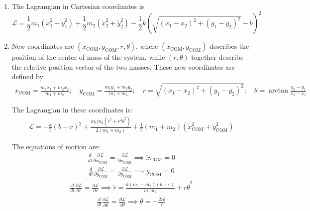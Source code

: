 \documentclass{article}
\theoremstyle{definition}
\newcommand{\p}{\partial}
\newcommand{\lag}{\mathcal{L}}
\newcommand{\f}[2]{\frac{#1}{#2}}
\newcommand{\lp}{\left(}
\newcommand{\rp}{\right)}
\begin{document}
\begin{enumerate}[label = (\alph*)]
	\item The Lagrangian in Cartesian coordinates is 
	\begin{equation*}
	\boxed{
	\lag = \f{1}{2}m_1(\dot{x}_1^2 + \dot{y}_1^2)+ \f{1}{2}m_2(\dot{x}_2^2 + \dot{y}_2^2) - \f{1}{2}k \lp \sqrt{(x_1-x_2)^2+(y_1-y_2)^2} -b \rp^2
	}
	\end{equation*}
	
	
	
	
	\item New coordinates are  $(x_\text{COM},y_{\text{COM}},r,\theta)$, where $(x_\text{COM}, y_\text{COM})$ describes the position of the center of mass of the system, while $(r,\theta)$ together describe the relative position vector of the two masses. These new coordinates are defined by 
	\begin{align*}
	x_\text{COM} = \f{m_1 x_1 + m_2 x_2}{m_1+m_2}; \quad y_\text{COM} = \f{m_1 y_1 + m_2 y_2}{m_1+m_2}; \quad r= \sqrt{(x_1-x_2)^2+(y_1-y_2)^2}; \quad \theta = \arctan\f{y_2-y_1}{x_2-x_1}
	\end{align*}
	
	
	The Lagrangian in these coordinates is:
	\begin{align*}
	\lag = -\f{k}{2} (b-r)^2+\frac{m_1m_2 \left(\dot r^2+r^2 \dot\theta^2\right)}{2(m_1+m_2)}
	+\frac{1}{2}(m_1+m_2) \left(\dot{x}_\text{COM}^2+\dot{y}_\text{COM}^2\right)
	\end{align*}
	
	The equations of motion are:
	\begin{align*}
	\f{d}{dt}\f{\p \lag}{\p \dot{x_\text{COM}}} = \f{\p \lag}{\p x_\text{COM}}
	\implies \ddot{x}_\text{COM} = 0
	\end{align*}
	\begin{align*}
	\f{d}{dt}\f{\p \lag}{\p \dot{y_\text{COM}}} = \f{\p \lag}{\p y_\text{COM}} \implies \ddot{y}_\text{COM} = 0
	\end{align*}
	\begin{align*}
	\f{d}{dt}\f{\p \lag}{\p \dot{r}} = \f{\p \lag}{\p r}
	\implies \ddot{r} = \f{k(m_1+m_2)(b-r)}{m_1m_2} + r\dot{\theta}^2
	\end{align*}
	\begin{align*}
	\f{d}{dt}\f{\p \lag}{\p \dot{\theta}} = \f{\p \lag}{\p \theta}\implies \ddot{\theta}  = -\f{2\dot{r}\dot{\theta}}{r}
	\end{align*}


\end{enumerate}
\end{document}
